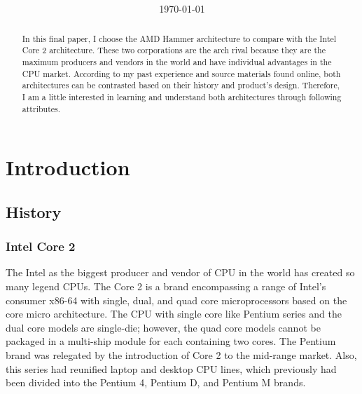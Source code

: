 \documentclass[letterpaper,10pt,compsoc,draftclsnofoot,onecolumn]{IEEEtran}
\title{
	\fontfamily{phv}\fontsize{36pt}{36pt}\fontseries{bx}\selectfont{
        AMD Hammer Architecture
        \\\vspace{1em}
        VS
        \\\vspace{1em}
        Intel Core2 Architecture
	}
}
\author{}
\date{\today}
\begin{document}
\begin{titlepage}
\begin{minipage}{1.0\textwidth}
\end{minipage}
\vfill
{\let\newpage\relax\maketitle}
\vfill
\begin{minipage}{1.0\textwidth}
\end{minipage}
\vfill
\begin{minipage}{1.0\textwidth}
\end{minipage}
\vfill
\begin{abstract}
\noindent In this final paper, I choose the AMD Hammer architecture to compare with the Intel Core 2 architecture. These two corporations are the arch rival because they are the maximum producers and vendors  in the world and have individual advantages in the CPU market. According to my past experience and source materials found online, both architectures can be contrasted based on their history and product’s design. Therefore, I am a little interested in learning and understand both architectures through following attributes.
\end{abstract}
\end{titlepage}

\section{Introduction}
\subsection{History}
\subsubsection{Intel Core 2}
The Intel as the biggest producer and vendor of CPU in the world has created so many legend CPUs. The Core 2 is a brand encompassing a range of Intel's consumer x86-64 with single, dual, and quad core microprocessors based on the core micro architecture. The CPU with single core like Pentium series and the dual core models are single-die; however, the quad core models cannot be packaged in a multi-ship module for each containing two cores\cite{pdf_intel_core}. The Pentium brand was relegated by the introduction of Core 2 to the mid-range market. Also, this series had reunified laptop and desktop CPU lines, which previously had been divided into the Pentium 4, Pentium D, and Pentium M brands.
\end{document}
